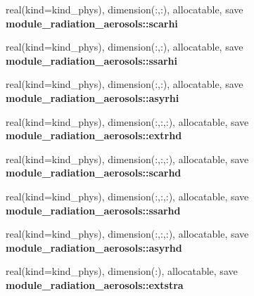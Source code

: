 \begin{DoxyCompactItemize}
real(kind=kind\+\_\+phys), dimension(\+:,\+:), allocatable, save {\bfseries module\+\_\+radiation\+\_\+aerosols\+::scarhi}
\item 
\mbox{\label{group__module__radiation__aerosols_gae4e1ead8bb34371c2d9f1b428846c10c}} 
real(kind=kind\+\_\+phys), dimension(\+:,\+:), allocatable, save {\bfseries module\+\_\+radiation\+\_\+aerosols\+::ssarhi}
\item 
\mbox{\label{group__module__radiation__aerosols_gaac2d735c117dd7d1e72264e611764f79}} 
real(kind=kind\+\_\+phys), dimension(\+:,\+:), allocatable, save {\bfseries module\+\_\+radiation\+\_\+aerosols\+::asyrhi}
\item 
\mbox{\label{group__module__radiation__aerosols_ga1c69f7b8ff0c98252e94def83dabfed4}} 
real(kind=kind\+\_\+phys), dimension(\+:,\+:,\+:), allocatable, save {\bfseries module\+\_\+radiation\+\_\+aerosols\+::extrhd}
\item 
\mbox{\label{group__module__radiation__aerosols_ga859ba893a7b0b727ce02f3f29906a0a6}} 
real(kind=kind\+\_\+phys), dimension(\+:,\+:,\+:), allocatable, save {\bfseries module\+\_\+radiation\+\_\+aerosols\+::scarhd}
\item 
\mbox{\label{group__module__radiation__aerosols_gac0714d386ee3dc2ca7f6692905566274}} 
real(kind=kind\+\_\+phys), dimension(\+:,\+:,\+:), allocatable, save {\bfseries module\+\_\+radiation\+\_\+aerosols\+::ssarhd}
\item 
\mbox{\label{group__module__radiation__aerosols_ga090d37e62ba333db64e28bf89e89a08d}} 
real(kind=kind\+\_\+phys), dimension(\+:,\+:,\+:), allocatable, save {\bfseries module\+\_\+radiation\+\_\+aerosols\+::asyrhd}
\item 
\mbox{\label{group__module__radiation__aerosols_gac0c59f22f472671cd86221cc1ed46c60}} 
real(kind=kind\+\_\+phys), dimension(\+:), allocatable, save {\bfseries module\+\_\+radiation\+\_\+aerosols\+::extstra}
\end{DoxyCompactItemize}
